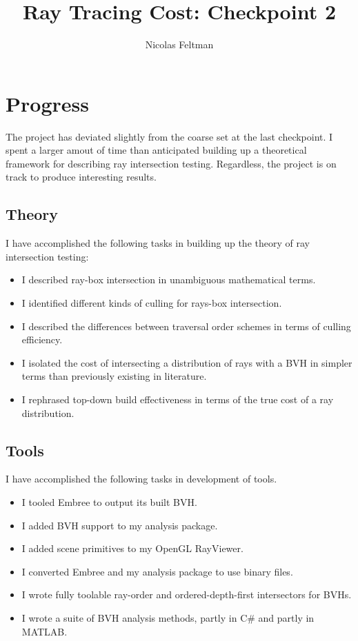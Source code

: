 \documentclass{article}
\title{Ray Tracing Cost: Checkpoint 2}
\author{Nicolas Feltman}
\begin{document}
\maketitle
\section{Progress}
The project has deviated slightly from the coarse set at the last checkpoint.  I spent a larger amout of time than anticipated building up a theoretical framework for describing ray intersection testing. Regardless, the project is on track to produce interesting results.

\subsection{Theory}
I have accomplished the following tasks in building up the theory of ray intersection testing:
\begin{itemize}
\item I described ray-box intersection in unambiguous mathematical terms.
\item I identified different kinds of culling for rays-box intersection.
\item I described the differences between traversal order schemes in terms of culling efficiency.
\item I isolated the cost of intersecting a distribution of rays with a BVH in simpler terms than previously existing in literature.
\item I rephrased top-down build effectiveness in terms of the true cost of a ray distribution.
\end{itemize}
\subsection{Tools}
I have accomplished the following tasks in development of tools.
\begin{itemize}
\item I tooled Embree to output its built BVH.
\item I added BVH support to my analysis package.
\item I added scene primitives to my OpenGL RayViewer.
\item I converted Embree and my analysis package to use binary files.
\item I wrote fully toolable ray-order and ordered-depth-first intersectors for BVHs.
\item I wrote a suite of BVH analysis methods, partly in C\# and partly in MATLAB.
\end{itemize}
\end{document}
